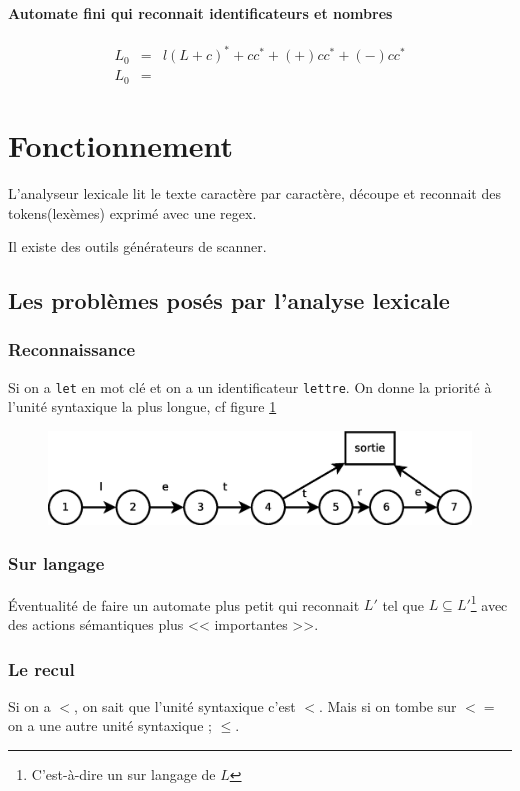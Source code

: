 \documentclass[12pt,a4paper,openany]{book}
\begin{document}
	\begin{exemple}
		\paragraph{Automate fini qui reconnait identificateurs et nombres}
		\begin{eqnarray*}
			L_0 &=&  l(L+c)^* + cc^* + (+) cc^* +(-)cc^*\\
			L_0 &=& 
		\end{eqnarray*}
	\end{exemple}

	\section{Fonctionnement}
	L'analyseur lexicale lit le texte caractère par caractère, découpe et reconnait des tokens(lexèmes) exprimé avec une regex.

	Il existe des outils générateurs de scanner.

	\subsection{Les problèmes posés par l'analyse lexicale}
	\subsubsection{Reconnaissance}
	Si on a \texttt{let} en mot clé et on a un identificateur \texttt{lettre}. On donne la priorité à l'unité syntaxique la plus longue, cf figure
	\ref{fig:recoPb} 

	\begin{figure}[H]
		\includegraphics[width=12cm]{Diagramme5.eps}
		\centering
		\label{fig:recoPb}
	\end{figure}
	\subsubsection{Sur langage}
	Éventualité de faire un automate plus petit qui reconnait $L'$ tel que $L\subseteq L'$\footnote{C'est-à-dire un sur langage de $L$} avec des actions
	sémantiques plus << importantes >>.

	\subsubsection{Le recul}
	Si on a $<$, on sait que l’unité syntaxique c’est $<$. Mais si on tombe sur $<=$ on a une autre unité syntaxique ; $\leq$.
\end{document}
